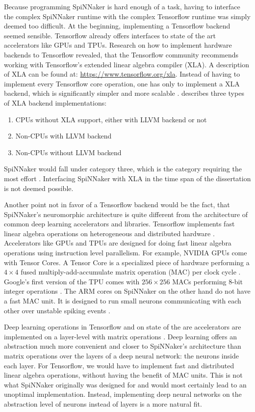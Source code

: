 \documentclass{article}
\begin{document}
Because programming SpiNNaker is hard enough of a task,
having to interface the complex SpiNNaker runtime with the
complex Tensorflow runtime was simply deemed too difficult.
At the beginning, implementing a Tensorflow backend seemed
sensible.
Tensorflow already offers interfaces to state of the art
accelerators like GPUs and TPUs.
Research on how to implement hardware backends to
Tensorflow revealed, that the Tensorflow community
recommends working with Tensorflow's extended linear
algebra compiler (XLA).
A description of XLA can be found at:
\url{https://www.tensorflow.org/xla}.
Instead of having to implement every Tensorflow core
operation, one has only to implement a XLA backend, which
is significantly simpler and more scalable
\citep{xla_backend}.
\citet{xla_backend} describes three types of XLA backend
implementations:
\begin{enumerate}
  \item CPUs without XLA support, either with LLVM backend
    or not
  \item Non-CPUs with LLVM backend
  \item Non-CPUs without LLVM backend
\end{enumerate}
SpiNNaker would fall under category three, which is the category
requiring the most effort \citep{xla_backend}.
Interfacing SpiNNaker with XLA in the time span of the
dissertation is not deemed possible.

Another point not in favor of a Tensorflow backend would be
the fact, that SpiNNaker's neuromorphic architecture is
quite different from the architecture of common deep
learning accelerators and libraries.
Tensorflow implements fast linear algebra operations on
heterogeneous and distributed hardware \citep{tf2015}.
Accelerators like GPUs and TPUs are designed for doing
fast linear algebra operations using instruction level parallelism.
For example, NVIDIA GPUs come with Tensor Cores.
A Tensor Core is a specialized piece of hardware performing a
$4\times4$ fused multiply-add-accumulate matrix operation (MAC) per
clock cycle \citep{markidis_et_al_2018}.
Google's first version of the TPU comes with $256\times256$ MACs
performing 8-bit integer operations \citep{tpus}.
The ARM cores on SpiNNaker on the other hand do not have a fast MAC
unit.
It is designed to run small neurons communicating with each other over
unstable spiking events \citep{furber_et_al_2007}.

Deep learning operations in Tensorflow and on state of the
are accelerators are implemented on a layer-level with
matrix operations \citep{goodfellow2016}.
Deep learning offers an abstraction much more convenient
and closer to SpiNNaker's architecture than matrix
operations over the layers of a deep neural network: the
neurons inside each layer.
For Tensorflow, we would have to implement fast and
distributed linear algebra operations, without having the benefit
of MAC units.
This is not what SpiNNaker originally was designed for and would
most certainly lead to an unoptimal implementation.
Instead, implementing deep neural networks on the
abstraction level of neurons instead of layers is a more natural fit.
\end{document}
